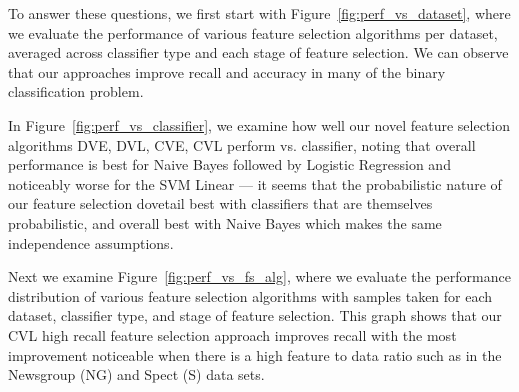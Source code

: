 To answer these questions, we first start with
Figure~\ref{fig:perf_vs_dataset}, where we evaluate the performance of
various feature selection algorithms per dataset, averaged across
classifier type and each stage of feature selection. We can observe that our approaches improve recall and accuracy in many of the binary classification problem.

In Figure~\ref{fig:perf_vs_classifier}, we examine how well our 
novel feature selection algorithms DVE, DVL, CVE, CVL 
perform vs. classifier, noting that overall performance is best
for Naive Bayes followed by Logistic Regression and noticeably worse for
the SVM Linear --- it seems that the probabilistic nature of our feature selection
dovetail best with classifiers that are themselves probabilistic,
and overall best with Naive Bayes which makes the same independence assumptions.

Next we examine Figure~\ref{fig:perf_vs_fs_alg}, where we evaluate the
performance distribution of various feature selection algorithms with
samples taken for each dataset, classifier type, and stage of feature
selection. This graph shows that our CVL high recall feature selection approach 
improves recall with the most improvement noticeable when there is a high
feature to data ratio such as in the Newsgroup (NG) and Spect (S) data
sets.  

